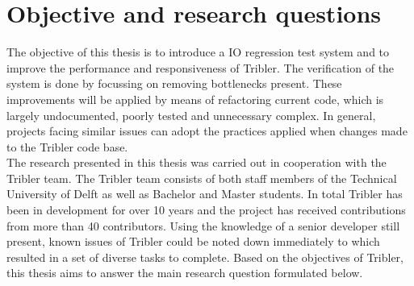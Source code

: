 


\section{Objective and research questions}
\label{chp2:sct:objectives-research-questions}
The objective of this thesis is to introduce a IO regression test system and to improve the performance and responsiveness of Tribler.
The verification of the system is done by focussing on removing bottlenecks present.
These improvements will be applied by means of refactoring current code, which is largely undocumented, poorly tested and unnecessary complex.
In general, projects facing similar issues can adopt the practices applied when changes made to the Tribler code base.\\

The research presented in this thesis was carried out in cooperation with the Tribler team. 
The Tribler team consists of both staff members of the Technical University of Delft as well as Bachelor and Master students.
In total Tribler has been in development for over 10 years and the project has received contributions from more than 40 contributors.
Using the knowledge of a senior developer still present, known issues of Tribler could be noted down immediately to which resulted in a set of diverse tasks to complete.
Based on the objectives of Tribler, this thesis aims to answer the main research question formulated below.\\

